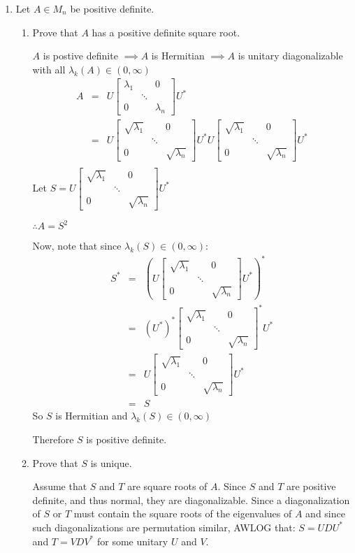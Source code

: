 \documentclass[letterpaper,12pt,fleqn]{article}
\renewcommand{\l}{\lambda}
\begin{document}
\begin{enumerate}
\begin{enumerate}
  \end{enumerate}

  \newpage
  
\item Let $A\in M_n$ be positive definite.

  \newcommand{\ma}{\begin{bmatrix}
      \l_1 & & 0 \\ & \ddots & \\ 0 & & \l_n \end{bmatrix}
  }
  \newcommand{\ms}{\begin{bmatrix}
      \sqrt{\l_1} & & 0 \\ & \ddots & \\ 0 & & \sqrt{\l_n} \end{bmatrix}
  }

  \begin{enumerate}
  \item Prove that $A$ has a positive definite square root.

    $A$ is postive definite $\implies A$ is Hermitian $\implies A$ is
    unitary diagonalizable with all $\l_k(A)\in(0,\infty)$
    \begin{eqnarray*}
      A &=& U\ma U^* \\
      &=& U\ms U^*U\ms U^* \\
    \end{eqnarray*}
    Let $S=U\ms U^*$

    $\therefore A=S^2$

    Now, note that since $\l_k(S)\in(0,\infty)$:
    \begin{eqnarray*}
      S^* &=& \left(U\ms U^*\right)^* \\
      &=& (U^*)^*\ms^*U^* \\
      &=& U\ms U^* \\
      &=& S
    \end{eqnarray*}
    So $S$ is Hermitian and $\l_k(S)\in(0,\infty)$

    Therefore $S$ is positive definite.

  \item Prove that $S$ is unique.

    Assume that $S$ and $T$ are square roots of $A$. Since $S$ and $T$ are
    positive definite, and thus normal, they are diagonalizable. Since a
    diagonalization of $S$ or $T$ must contain the square roots of the
    eigenvalues of $A$ and since such diagonalizations are permutation similar,
    AWLOG that: $S=UDU^*$ and $T=VDV^*$ for some unitary $U$ and $V$.


\end{enumerate}
\end{enumerate}
\end{document}
